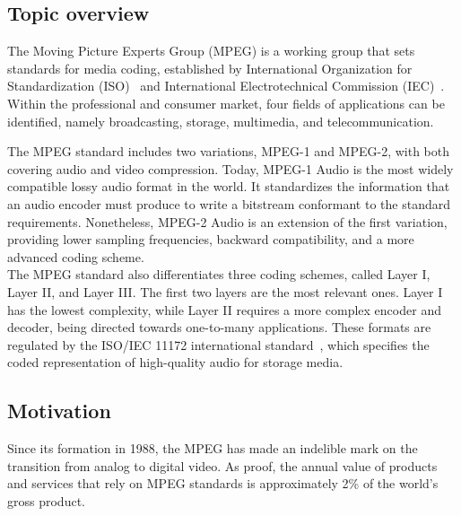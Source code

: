 
\subsection{Topic overview}
The Moving Picture Experts Group (MPEG) is a working group that sets standards
for media coding, established by International Organization for Standardization
(ISO)~\cite{iso} and International Electrotechnical Commission (IEC)~\cite{iec}.
Within the professional and consumer market, four fields of applications can be
identified, namely broadcasting, storage, multimedia, and telecommunication.

The MPEG standard includes two variations, MPEG-1 and MPEG-2, with both covering
audio and video compression.  Today, MPEG-1 Audio is the most widely compatible
lossy audio format in the world. It standardizes the information that an audio
encoder must produce to write a bitstream conformant to the standard
requirements.  Nonetheless, MPEG-2 Audio is an extension of the first variation,
providing lower sampling frequencies, backward compatibility, and a more
advanced coding scheme.\\

The MPEG standard also differentiates three coding schemes, called Layer I,
Layer II, and Layer III.  The first two layers are the most relevant ones. Layer
I has the lowest complexity, while Layer II requires a more complex encoder and
decoder, being directed towards one-to-many applications. These formats are
regulated by the ISO/IEC 11172 international standard~\cite{11172}, which
specifies the coded representation of high-quality audio for storage media.

\subsection{Motivation}

Since its formation in 1988, the MPEG has made an indelible mark on the
transition from analog to digital video. As proof, the annual value of products
and services that rely on MPEG standards is approximately 2\% of the world's
gross product.

